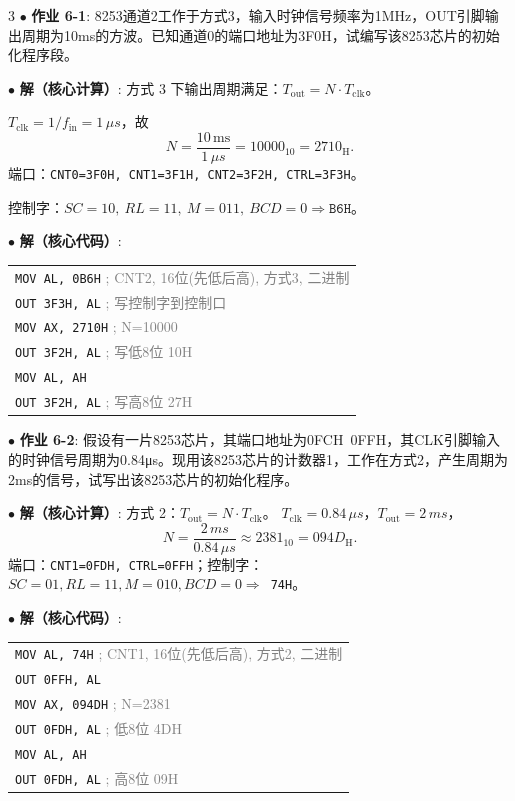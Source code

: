 \documentclass[10pt, a4paper, landscape]{article}
\newcommand{\green}[1]{\textbf{\textcolor{mygreen}{#1}}}
\newcommand{\entry}[2]{$\bullet$ \textbf{#1}: #2\par\vspace{0.5pt}}
\begin{document}
\begin{multicols*}{3}
\entry{\green{作业 6-1}}{8253通道2工作于方式3，输入时钟信号频率为1MHz，OUT引脚输出周期为10ms的方波。已知通道0的端口地址为3F0H，试编写该8253芯片的初始化程序段。}

\entry{解（核心计算）}{
方式 3 下输出周期满足：$T_{\text{out}}=N\cdot T_{\text{clk}}$。\par
$T_{\text{clk}}=1/f_{\text{in}}=1\,\mu s$，故
\[
N=\frac{10\,\text{ms}}{1\,\mu s}=10000_{10}=2710_{\mathrm{H}}.
\]
端口：\texttt{CNT0=3F0H, CNT1=3F1H, CNT2=3F2H, CTRL=3F3H}。\par
控制字：$SC=10,\ RL=11,\ M=011,\ BCD=0 \Rightarrow \texttt{B6H}$。
}

\entry{解（核心代码）}{
\begin{tabular}{@{}l@{}}
\texttt{MOV  AL, 0B6H} \quad \textcolor{gray}{; CNT2, 16位(先低后高), 方式3, 二进制} \\
\texttt{OUT  3F3H, AL} \quad \textcolor{gray}{; 写控制字到控制口} \\
\texttt{MOV  AX, 2710H} \quad \textcolor{gray}{; N=10000} \\
\texttt{OUT  3F2H, AL} \quad \textcolor{gray}{; 写低8位 10H} \\
\texttt{MOV  AL, AH} \\
\texttt{OUT  3F2H, AL} \quad \textcolor{gray}{; 写高8位 27H} \\
\end{tabular}
}

\entry{\green{作业 6-2}}{假设有一片8253芯片，其端口地址为0FCH~0FFH，其CLK引脚输入的时钟信号周期为0.84μs。现用该8253芯片的计数器1，工作在方式2，产生周期为2ms的信号，试写出该8253芯片的初始化程序。}

\entry{解（核心计算）}{
方式 2：$T_{\text{out}} = N\cdot T_{\text{clk}}$。\quad
$T_{\text{clk}}=0.84\,\mu s$，$T_{\text{out}}=2\,ms$，
\[
N=\frac{2\,ms}{0.84\,\mu s}\approx 2381_{10}=094D_{\mathrm{H}}.
\]
端口：\texttt{CNT1=0FDH,\ CTRL=0FFH}；控制字：$SC=01,RL=11,M=010,BCD=0\Rightarrow$\ \texttt{74H}。
}

\entry{解（核心代码）}{
\begin{tabular}{@{}l@{}}
\texttt{MOV  AL, 74H} \quad \textcolor{gray}{; CNT1, 16位(先低后高), 方式2, 二进制}\\
\texttt{OUT  0FFH, AL} \\
\texttt{MOV  AX, 094DH} \quad \textcolor{gray}{; N=2381}\\
\texttt{OUT  0FDH, AL} \quad \textcolor{gray}{; 低8位 4DH}\\
\texttt{MOV  AL, AH} \\
\texttt{OUT  0FDH, AL} \quad \textcolor{gray}{; 高8位 09H}\\
\end{tabular}
}


\end{multicols*}
\end{document}

